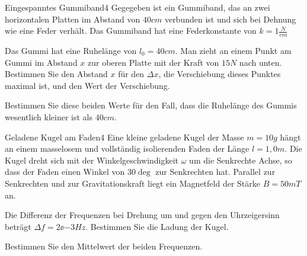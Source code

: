 

\begin{problem}{Eingespanntes Gummiband}{4}
Gegegeben ist ein Gummiband, das an zwei horizontalen Platten im Abstand von $40\unit{cm}$ verbunden ist und sich bei Dehnung wie eine Feder verhält. Das Gummiband hat eine Federkonstante von $k=1\unit{\frac{N}{cm}}$
\begin{abcenum}
  \item Das Gummi hat eine Ruhelänge von $l_0=40\unit{cm}$. Man zieht an einem Punkt am Gummi im Abstand $x$ zur oberen Platte mit der Kraft von $15\unit{N}$ nach unten. Bestimmen Sie den Abstand $x$ für den $\Delta x$, die Verschiebung dieses Punktes maximal ist, und den Wert der Verschiebung.
  \item Bestimmen Sie diese beiden Werte für den Fall, dass die Ruhelänge des Gummis wesentlich kleiner ist als $40\unit{cm}$.
\end{abcenum}
\end{problem}

\begin{problem}{Geladene Kugel am Faden}{4}
Eine kleine geladene Kugel der Masse $m=10\unit{g}$ hängt an einem masselosem und vollständig isolierenden Faden der Länge $l=1,0\unit{m}$. Die Kugel dreht sich mit der Winkelgeschwindigkeit $\omega$ um die Senkrechte Achse, so dass der Faden einen Winkel von $30\deg$ zur Senkrechten hat. Parallel zur Senkrechten und zur Gravitationskraft liegt ein Magnetfeld der Stärke $B=50\unit{mT}$ an.
\begin{abcenum}
  \item Die Differenz der Frequenzen bei Drehung um und gegen den Uhrzeigersinn beträgt $\Delta f=2\ee{-3}\unit{Hz}$. Bestimmen Sie die Ladung der Kugel.
  \item Bestimmen Sie den Mittelwert der beiden Frequenzen.
\end{abcenum}
\end{problem}

